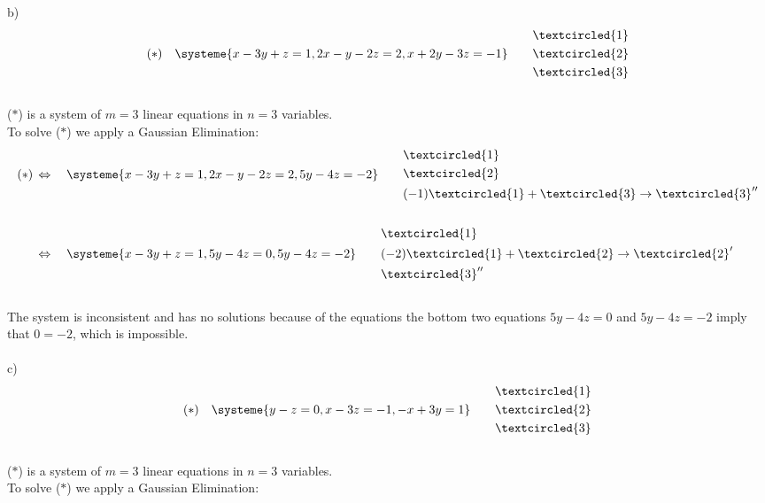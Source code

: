 \documentclass{jhwhw}
\begin{document}
b) \begin{align*} 
(\ast) \quad \systeme{x-3y+z=1, 2x-y-2z=2, x+2y-3z=-1} \quad \quad \begin{aligned} &\textcircled{1} \\ &\textcircled{2} \\ &\textcircled{3}\end{aligned}
\end{align*}
\\
(\(\ast\)) is a system of \(m=3\) linear equations in \(n=3\) variables. 
\\
To solve (\(\ast\)) we apply a Gaussian Elimination:
\\

\begin{align*} 
(\ast) \, &\Leftrightarrow \quad \systeme{x-3y+z=1, 2x-y-2z=2, 5y-4z=-2} \quad \quad \begin{aligned} &\textcircled{1} \\ &\textcircled{2} \\ &(-1)\textcircled{1}+\textcircled{3} \rightarrow \textcircled{3}''\end{aligned}
\\ \\ 
&\Leftrightarrow \quad \systeme{x-3y+z=1, 5y-4z=0, 5y-4z=-2} \quad \quad \begin{aligned} &\textcircled{1} \\ &(-2)\textcircled{1}+\textcircled{2} \rightarrow \textcircled{2}' \\ &\textcircled{3}''\end{aligned}
\end{align*}
\\
The system is inconsistent and has no solutions because of the equations the bottom two equations \(5y-4z=0\) and \(5y-4z=-2\) imply that \(0=-2\), which is impossible.
\\ \\

c) \begin{align*} 
(\ast) \quad \systeme{y-z=0, x-3z=-1, -x+3y=1} \quad \quad \begin{aligned} &\textcircled{1} \\ &\textcircled{2} \\ &\textcircled{3}\end{aligned}
\end{align*}
\\
(\(\ast\)) is a system of \(m=3\) linear equations in \(n=3\) variables. 
\\
To solve (\(\ast\)) we apply a Gaussian Elimination:
\\
\end{document}
